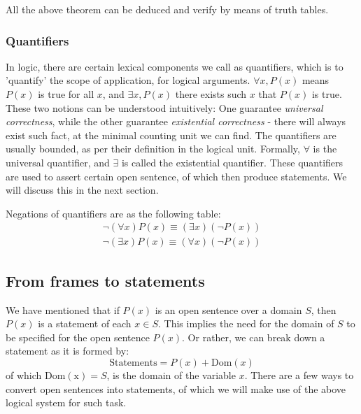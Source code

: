 All the above theorem can be deduced and verify by means of truth tables. 

\subsubsection{Quantifiers}

In logic, there are certain lexical components we call as quantifiers, which is to 'quantify' the scope of application, for logical arguments. $\forall x,P(x)$ means $P(x)$ is true for all $x$, and $\exists x,P(x)$ there exists such $x$ that $P(x)$ is true. These two notions can be understood intuitively: One guarantee \textit{universal correctness}, while the other guarantee \textit{existential correctness} - there will always exist such fact, at the minimal counting unit we can find. The quantifiers are usually bounded, as per their definition in the logical unit. Formally, $\forall$ is the universal quantifier, and $\exists$ is called the existential quantifier. These quantifiers are used to assert certain open sentence, of which then produce statements. We will discuss this in the next section. 

Negations of quantifiers are as the following table:
\begin{align}
    \lnot(\forall x)P(x)\equiv (\exists x)(\lnot P(x)) \\
    \lnot (\exists x)P(x) \equiv (\forall x)(\lnot P(x))
\end{align}
\subsection{From frames to statements}

We have mentioned that if $P(x)$ is an open sentence over a domain $S$, then $P(x)$ is a statement of each $x\in S$. This implies the need for the domain of $S$ to be specified for the open sentence $P(x)$. Or rather, we can break down a statement as it is formed by: 
\begin{equation}
    \text{Statements} = P(x) + \mathrm{Dom}(x)
\end{equation}
of which $\mathrm{Dom(x)}=S$, is the domain of the variable $x$. There are a few ways to convert open sentences into statements, of which we will make use of the above logical system for such task. 
